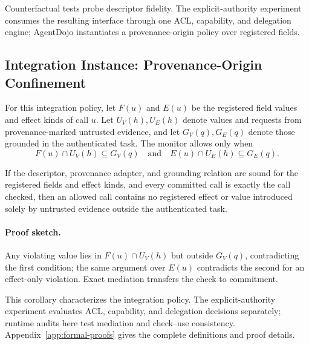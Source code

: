 Counterfactual tests probe descriptor fidelity. The explicit-authority
experiment consumes the resulting interface through one ACL, capability, and
delegation engine; AgentDojo instantiates a provenance-origin policy over
registered fields.

\subsection{Integration Instance: Provenance-Origin Confinement}

For this integration policy, let $F(u)$ and $E(u)$ be the registered field values
and effect kinds of call $u$.  Let $U_V(h),U_E(h)$ denote values and requests
from provenance-marked untrusted evidence, and let $G_V(q),G_E(q)$ denote those
grounded in the authenticated task.  The monitor allows only when
\[
  F(u)\cap U_V(h)\subseteq G_V(q)
  \quad\text{and}\quad
  E(u)\cap U_E(h)\subseteq G_E(q).
\]

\begin{corollary}
\label{thm:single-commit}
If the descriptor, provenance adapter, and grounding relation are sound for the
registered fields and effect kinds, and every committed call is exactly the
call checked, then an allowed call contains no registered effect or value
introduced solely by untrusted evidence outside the authenticated task.
\end{corollary}

\paragraph{Proof sketch.}
Any violating value lies in $F(u)\cap U_V(h)$ but outside $G_V(q)$, contradicting
the first condition; the same argument over $E(u)$ contradicts the second for
an effect-only violation.  Exact mediation transfers the check to commitment.

This corollary characterizes the integration policy.  The explicit-authority
experiment evaluates ACL, capability, and delegation decisions separately;
runtime audits here test mediation and check--use consistency.
Appendix~\ref{app:formal-proofs} gives the complete definitions and proof
details.
